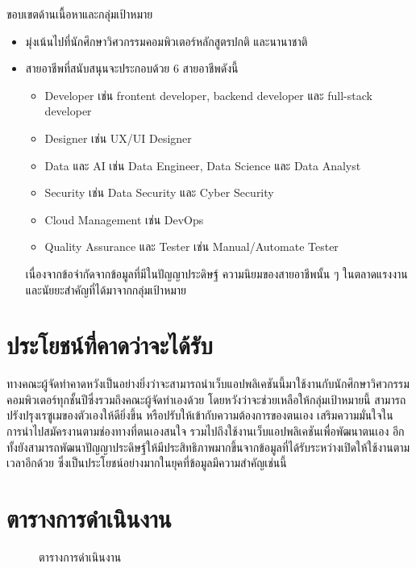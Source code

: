 ขอบเขตด้านเนื้อหาและกลุ่มเป้าหมาย
\begin{itemize}
    \item  มุ่งเน้นไปที่นักศึกษาวิศวกรรมคอมพิวเตอร์หลักสูตรปกติ และนานาชาติ
    \item  สายอาชีพที่สนับสนุนจะประกอบด้วย 6 สายอาชีพดังนี้
    \begin{itemize}
        \item Developer เช่น frontent developer, backend developer และ full-stack developer
        \item Designer เช่น UX/UI Designer
        \item Data และ AI เช่น Data Engineer, Data Science และ Data Analyst
        \item Security เช่น Data Security และ Cyber Security
        \item Cloud Management เช่น DevOps
        \item Quality Assurance และ Tester เช่น Manual/Automate Tester
    \end{itemize}
    เนื่องจากข้อจำกัดจากข้อมูลที่มีในปัญญาประดิษฐ์ ความนิยมของสายอาชีพนั้น ๆ ในตลาดแรงงาน \cite{springnews} และนัยยะสำคัญที่ได้มาจากกลุ่มเป้าหมาย
\end{itemize}

\section{ประโยชน์ที่คาดว่าจะได้รับ}

ทางคณะผู้จัดทำคาดหวังเป็นอย่างยิ่งว่าจะสามารถนำเว็บแอปพลิเคชันนี้มาใช้งานกับนักศึกษาวิศวกรรมคอมพิวเตอร์ทุกชั้นปีซึ่งรวมถึงคณะผู้จัดทำเองด้วย โดยหวังว่าจะช่วยเหลือให้กลุ่มเป้าหมายนี้ สามารถปรังปรุงเรซูเมของตัวเองให้ดียิ่งขึ้น หรือปรับให้เข้ากับความต้องการของตนเอง เสริมความมั่นใจในการนำไปสมัครงานตามช่องทางที่ตนเองสนใจ รวมไปถึงใช้งานเว็บแอปพลิเคชันเพื่อพัฒนาตนเอง อีกทั้งยังสามารถพัฒนาปัญญาประดิษฐ์ให้มีประสิทธิภาพมากขึ้นจากข้อมูลที่ได้รับระหว่างเปิดให้ใช้งานตามเวลาอีกด้วย ซึ่งเป็นประโยชน์อย่างมากในยุคที่ข้อมูลมีความสำคัญเช่นนี้

\section{ตารางการดำเนินงาน}
\begin{figure}[!h]\centering
    \setlength{\fboxrule}{0.2mm}
    \setlength{\fboxsep}{0.5cm}
    \caption{ตารางการดำเนินงาน}\label{fig:model4}
\end{figure}